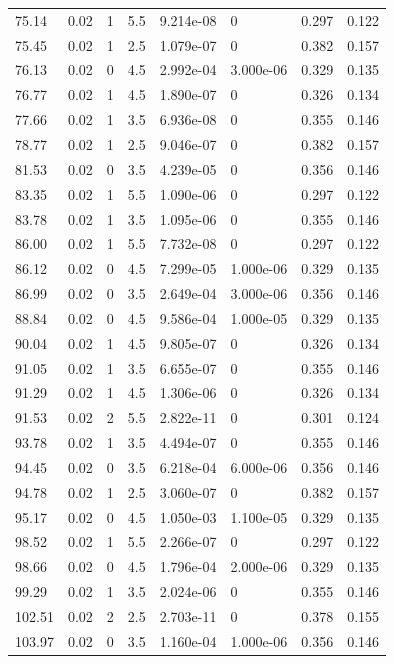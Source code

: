 \documentclass[preview]{standalone}
\begin{document}
{{{\begin{tabular}{L{1.2cm}C{1.2cm} C{0.3cm}C{0.5cm} C{1.4cm}C{1.4cm} C{1.4cm}C{1.4cm}}
  75.14  &  0.02  & 1     & 5.5 &  9.214e-08  & 0  & 0.297 &  0.122   \\ 
  75.45  &  0.02  & 1     & 2.5 &  1.079e-07  & 0  & 0.382 &  0.157   \\ 
  76.13  &  0.02  & 0     & 4.5 &  2.992e-04  & 3.000e-06  & 0.329 &  0.135   \\ 
  76.77  &  0.02  & 1     & 4.5 &  1.890e-07  & 0  & 0.326 &  0.134   \\ 
  77.66  &  0.02  & 1     & 3.5 &  6.936e-08  & 0  & 0.355 &  0.146   \\ 
  78.77  &  0.02  & 1     & 2.5 &  9.046e-07  & 0  & 0.382 &  0.157   \\ 
  81.53  &  0.02  & 0     & 3.5 &  4.239e-05  & 0  & 0.356 &  0.146   \\ 
  83.35  &  0.02  & 1     & 5.5 &  1.090e-06  & 0  & 0.297 &  0.122   \\ 
  83.78  &  0.02  & 1     & 3.5 &  1.095e-06  & 0  & 0.355 &  0.146   \\ 
  86.00  &  0.02  & 1     & 5.5 &  7.732e-08  & 0  & 0.297 &  0.122   \\ 
  86.12  &  0.02  & 0     & 4.5 &  7.299e-05  & 1.000e-06  & 0.329 &  0.135   \\ 
  86.99  &  0.02  & 0     & 3.5 &  2.649e-04  & 3.000e-06  & 0.356 &  0.146   \\ 
  88.84  &  0.02  & 0     & 4.5 &  9.586e-04  & 1.000e-05  & 0.329 &  0.135   \\ 
  90.04  &  0.02  & 1     & 4.5 &  9.805e-07  & 0  & 0.326 &  0.134   \\ 
  91.05  &  0.02  & 1     & 3.5 &  6.655e-07  & 0  & 0.355 &  0.146   \\ 
  91.29  &  0.02  & 1     & 4.5 &  1.306e-06  & 0  & 0.326 &  0.134   \\ 
  91.53  &  0.02  & 2     & 5.5 &  2.822e-11  & 0  & 0.301 &  0.124   \\ 
  93.78  &  0.02  & 1     & 3.5 &  4.494e-07  & 0  & 0.355 &  0.146   \\ 
  94.45  &  0.02  & 0     & 3.5 &  6.218e-04  & 6.000e-06  & 0.356 &  0.146   \\ 
  94.78  &  0.02  & 1     & 2.5 &  3.060e-07  & 0  & 0.382 &  0.157   \\ 
  95.17  &  0.02  & 0     & 4.5 &  1.050e-03  & 1.100e-05  & 0.329 &  0.135   \\ 
  98.52  &  0.02  & 1     & 5.5 &  2.266e-07  & 0  & 0.297 &  0.122   \\ 
  98.66  &  0.02  & 0     & 4.5 &  1.796e-04  & 2.000e-06  & 0.329 &  0.135   \\ 
  99.29  &  0.02  & 1     & 3.5 &  2.024e-06  & 0  & 0.355 &  0.146   \\ 
  102.51  &  0.02  & 2     & 2.5 &  2.703e-11  & 0  & 0.378 &  0.155   \\ 
  103.97  &  0.02  & 0     & 3.5 &  1.160e-04  & 1.000e-06  & 0.356 &  0.146   \\ 
\hline 
\end{tabular} 

}}}
\end{document}
